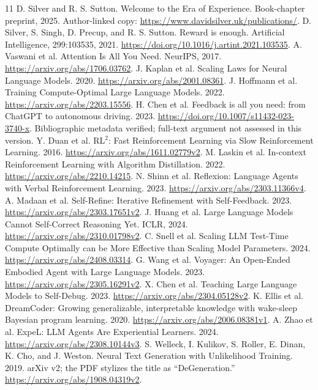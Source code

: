 \documentclass[11pt]{article}
\begin{document}
\begingroup\small
\begin{thebibliography}{11}
 D. Silver and R. S. Sutton. Welcome to the Era of Experience.
Book-chapter preprint, 2025. Author-linked copy:
\url{https://www.davidsilver.uk/publications/}.
 D. Silver, S. Singh, D. Precup, and R. S. Sutton.
Reward is enough. Artificial Intelligence, 299:103535, 2021.
\url{https://doi.org/10.1016/j.artint.2021.103535}.
 A. Vaswani et al. Attention Is All You Need. NeurIPS, 2017.
\url{https://arxiv.org/abs/1706.03762}.
 J. Kaplan et al. Scaling Laws for Neural Language Models. 2020.
\url{https://arxiv.org/abs/2001.08361}.
 J. Hoffmann et al. Training Compute-Optimal Large Language Models. 2022.
\url{https://arxiv.org/abs/2203.15556}.
 H. Chen et al. Feedback is all you need: from ChatGPT to autonomous driving. 2023.
\url{https://doi.org/10.1007/s11432-023-3740-x}. Bibliographic metadata verified;
full-text argument not assessed in this version.
 Y. Duan et al. RL$^2$: Fast Reinforcement Learning via Slow Reinforcement Learning. 2016.
\url{https://arxiv.org/abs/1611.02779v2}.
 M. Laskin et al. In-context Reinforcement Learning with Algorithm Distillation. 2022.
\url{https://arxiv.org/abs/2210.14215}.
 N. Shinn et al. Reflexion: Language Agents with Verbal Reinforcement Learning. 2023.
\url{https://arxiv.org/abs/2303.11366v4}.
 A. Madaan et al. Self-Refine: Iterative Refinement with Self-Feedback. 2023.
\url{https://arxiv.org/abs/2303.17651v2}.
 J. Huang et al. Large Language Models Cannot Self-Correct Reasoning Yet. ICLR, 2024.
\url{https://arxiv.org/abs/2310.01798v2}.
 C. Snell et al. Scaling LLM Test-Time Compute Optimally can be More Effective than Scaling Model Parameters. 2024.
\url{https://arxiv.org/abs/2408.03314}.
 G. Wang et al. Voyager: An Open-Ended Embodied Agent with Large Language Models. 2023.
\url{https://arxiv.org/abs/2305.16291v2}.
 X. Chen et al. Teaching Large Language Models to Self-Debug. 2023.
\url{https://arxiv.org/abs/2304.05128v2}.
 K. Ellis et al. DreamCoder: Growing generalizable,
interpretable knowledge with wake-sleep Bayesian program learning. 2020.
\url{https://arxiv.org/abs/2006.08381v1}.
 A. Zhao et al. ExpeL: LLM Agents Are Experiential Learners. 2024.
\url{https://arxiv.org/abs/2308.10144v3}.
 S. Welleck, I. Kulikov, S. Roller, E. Dinan,
K. Cho, and J. Weston. Neural Text Generation with Unlikelihood Training.
2019. arXiv v2; the PDF stylizes the title as ``DeGeneration.''
\url{https://arxiv.org/abs/1908.04319v2}.
\end{thebibliography}
\endgroup
\end{document}
